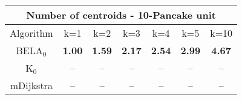\begin{tabular}{c|cccccc}\toprule
\multicolumn{7}{c}{Number of centroids - 10-Pancake unit}\\ \midrule
Algorithm & k=1 & k=2 & k=3 & k=4 & k=5 & k=10 \\ \midrule
BELA$_0$ & \textbf{1.00} & \textbf{1.59} & \textbf{2.17} & \textbf{2.54} & \textbf{2.99} & \textbf{4.67} \\
K$_0$ & -- & -- & -- & -- & -- & -- \\
mDijkstra & -- & -- & -- & -- & -- & -- \\ \bottomrule 
\end{tabular}
